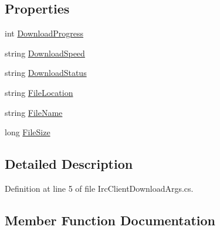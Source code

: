 \subsection*{Properties}
\begin{DoxyCompactItemize}
\item 
int \mbox{\hyperlink{class_little_weeb_library_1_1_event_arguments_1_1_irc_client_download_event_args_aa939c25b51a6fa3ceadd3f22d2f630c4}{Download\+Progress}}
\item 
string \mbox{\hyperlink{class_little_weeb_library_1_1_event_arguments_1_1_irc_client_download_event_args_a0d1c494e39acae88a865520f60d60ea6}{Download\+Speed}}
\item 
string \mbox{\hyperlink{class_little_weeb_library_1_1_event_arguments_1_1_irc_client_download_event_args_a59c5c002bc9b25fea03c12fd0c8a8769}{Download\+Status}}
\item 
string \mbox{\hyperlink{class_little_weeb_library_1_1_event_arguments_1_1_irc_client_download_event_args_a1f2b2510d2f6c011c709be1610bb0a3a}{File\+Location}}
\item 
string \mbox{\hyperlink{class_little_weeb_library_1_1_event_arguments_1_1_irc_client_download_event_args_ae708a4da9c599b02372c55dd08294cd5}{File\+Name}}
\item 
long \mbox{\hyperlink{class_little_weeb_library_1_1_event_arguments_1_1_irc_client_download_event_args_a1d39a926b93644e0d7dd5e0c2e6f6164}{File\+Size}}
\end{DoxyCompactItemize}


\subsection{Detailed Description}


Definition at line 5 of file Irc\+Client\+Download\+Args.\+cs.



\subsection{Member Function Documentation}
\mbox{\label{class_little_weeb_library_1_1_event_arguments_1_1_irc_client_download_event_args_a08055fe777a1585dafab7fbeec58b891}} 
